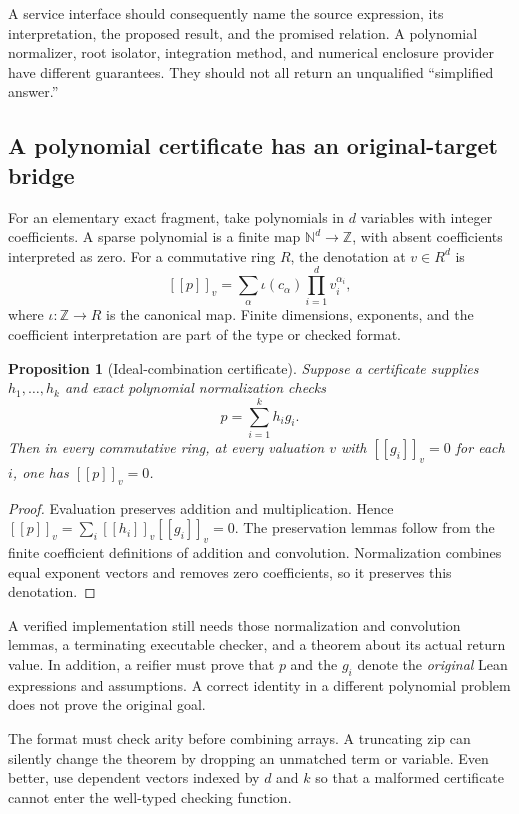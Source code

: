 \documentclass[11pt,letterpaper]{article}
\newcommand{\N}{\mathbb N}\newcommand{\Z}{\mathbb Z}\newcommand{\Q}{\mathbb Q}\newcommand{\R}{\mathbb R}
\newcommand{\den}[1]{[\![#1]\!]}
\newtheorem{proposition}[theorem]{Proposition}
\theoremstyle{definition}\newtheorem{definition}[theorem]{Definition}
\theoremstyle{remark}\newtheorem{remark}[theorem]{Remark}
\begin{document}
A service interface should consequently name the source expression, its
interpretation, the proposed result, and the promised relation. A polynomial
normalizer, root isolator, integration method, and numerical enclosure provider
have different guarantees. They should not all return an unqualified
``simplified answer.''

\subsection{A polynomial certificate has an original-target bridge}
For an elementary exact fragment, take polynomials in $d$ variables with
integer coefficients. A sparse polynomial is a finite map
$\N^d\to\Z$, with absent coefficients interpreted as zero. For a
commutative ring $R$, the denotation at $v\in R^d$ is
\[
 \den{p}_v=\sum_{\alpha} \iota(c_\alpha)
                  \prod_{i=1}^{d}v_i^{\alpha_i},
\]
where $\iota:\Z\to R$ is the canonical map. Finite dimensions, exponents,
and the coefficient interpretation are part of the type or checked format.

\begin{proposition}[Ideal-combination certificate]
Suppose a certificate supplies $h_1,\ldots,h_k$ and exact polynomial
normalization checks
\[
 p=\sum_{i=1}^{k}h_ig_i.
\]
Then in every commutative ring, at every valuation $v$ with
$\den{g_i}_v=0$ for each $i$, one has $\den{p}_v=0$.
\end{proposition}
\begin{proof}
Evaluation preserves addition and multiplication. Hence
$\den{p}_v=\sum_i\den{h_i}_v\den{g_i}_v=0$.
The preservation lemmas follow from the finite coefficient definitions of
addition and convolution. Normalization combines equal exponent vectors and
removes zero coefficients, so it preserves this denotation.
\end{proof}

A verified implementation still needs those normalization and convolution
lemmas, a terminating executable checker, and a theorem about its actual
return value. In addition, a reifier must prove that $p$ and the $g_i$ denote
the \emph{original} Lean expressions and assumptions. A correct identity in
a different polynomial problem does not prove the original goal.

The format must check arity before combining arrays. A truncating zip can
silently change the theorem by dropping an unmatched term or variable. Even
better, use dependent vectors indexed by $d$ and $k$ so that a malformed
certificate cannot enter the well-typed checking function.
\end{document}
